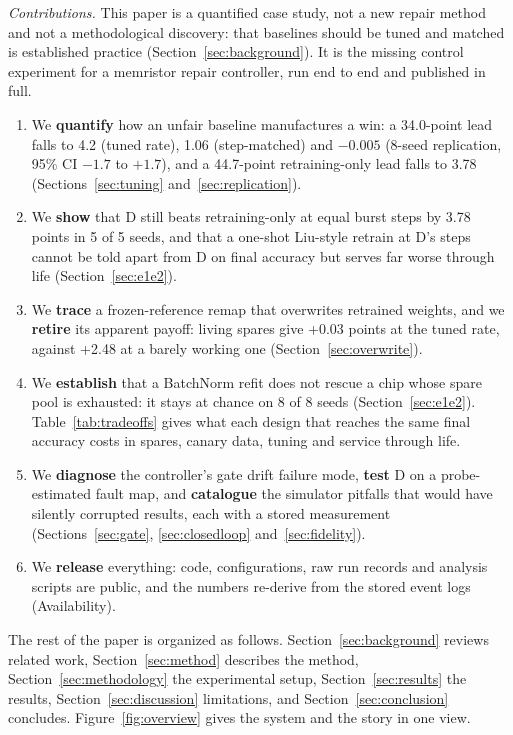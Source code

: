 \documentclass[journal]{IEEEtran}
\begin{document}
\textit{Contributions.}
This paper is a quantified case study, not a new repair method and not a methodological discovery: that baselines should be tuned and matched is established practice (Section~\ref{sec:background}).
It is the missing control experiment for a memristor repair controller, run end to end and published in full.
\begin{enumerate}
\item We \textbf{quantify} how an unfair baseline manufactures a win: a 34.0-point lead falls to 4.2 (tuned rate), 1.06 (step-matched) and $-0.005$ (8-seed replication, 95\% CI $-1.7$ to $+1.7$), and a 44.7-point retraining-only lead falls to 3.78 (Sections~\ref{sec:tuning} and~\ref{sec:replication}).
\item We \textbf{show} that D still beats retraining-only at equal burst steps by 3.78 points in 5 of 5 seeds, and that a one-shot Liu-style retrain at D's steps cannot be told apart from D on final accuracy but serves far worse through life (Section~\ref{sec:e1e2}).
\item We \textbf{trace} a frozen-reference remap that overwrites retrained weights, and we \textbf{retire} its apparent payoff: living spares give +0.03 points at the tuned rate, against +2.48 at a barely working one (Section~\ref{sec:overwrite}).
\item We \textbf{establish} that a BatchNorm refit does not rescue a chip whose spare pool is exhausted: it stays at chance on 8 of 8 seeds (Section~\ref{sec:e1e2}). Table~\ref{tab:tradeoffs} gives what each design that reaches the same final accuracy costs in spares, canary data, tuning and service through life.
\item We \textbf{diagnose} the controller's gate drift failure mode, \textbf{test} D on a probe-estimated fault map, and \textbf{catalogue} the simulator pitfalls that would have silently corrupted results, each with a stored measurement (Sections~\ref{sec:gate}, \ref{sec:closedloop} and~\ref{sec:fidelity}).
\item We \textbf{release} everything: code, configurations, raw run records and analysis scripts are public, and the numbers re-derive from the stored event logs (Availability).
\end{enumerate}

The rest of the paper is organized as follows.
Section~\ref{sec:background} reviews related work, Section~\ref{sec:method} describes the method, Section~\ref{sec:methodology} the experimental setup, Section~\ref{sec:results} the results, Section~\ref{sec:discussion} limitations, and Section~\ref{sec:conclusion} concludes.
Figure~\ref{fig:overview} gives the system and the story in one view.
\end{document}

